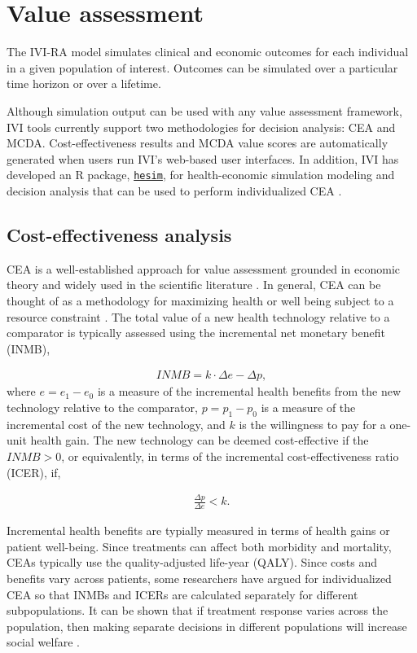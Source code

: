 \documentclass[11pt,final,fleqn]{article}\usepackage[]{graphicx}\usepackage[]{color}
\theoremstyle{plain}
\newcommand{\code}[1]{\texttt{#1}}
\begin{document}
\section{Value assessment}\label{sec:value-assessment}
The IVI-RA model simulates clinical and economic outcomes for each individual in a given population of interest. Outcomes can be simulated over a particular time horizon or over a lifetime. 

Although simulation output can be used with any value assessment framework, IVI tools currently support two methodologies for decision analysis: CEA and MCDA. Cost-effectiveness results and MCDA value scores are automatically generated when users run IVI's web-based user interfaces. In addition, IVI has developed an R package, \code{\href{https://innovationvalueinitiative.github.io/hesim/}{hesim}}, for health-economic simulation modeling and decision analysis that can be used to perform individualized CEA \citep{basu2007value, ioannidis2011individualized, espinoza2014value}. 

\subsection{Cost-effectiveness analysis}\label{sec:cea}
CEA is a well-established approach for value assessment grounded in economic theory and widely used in the scientific literature \citep{briggs2006decision, meltzer2011theoretical, drummond2015methods}. In general, CEA can be thought of as a methodology for maximizing health or well being subject to a resource constraint \citep{garber1997economic}. The total value of a new health technology relative to a comparator is typically assessed using the incremental net monetary benefit (INMB), 

\begin{align}
INMB = k \cdot \Delta e - \Delta p, 
\end{align}
where $e = e_1 - e_0$ is a measure of the incremental health benefits from the new technology relative to the comparator, $p = p_1 - p_0$ is a measure of the incremental cost of the new technology, and $k$ is the willingness to pay for a one-unit health gain. The new technology can be deemed cost-effective if the $INMB > 0$, or equivalently, in terms of the incremental cost-effectiveness ratio (ICER), if,

\begin{align}
\frac{\Delta p}{\Delta e} < k.
\end{align}

Incremental health benefits are typially measured in terms of health gains or patient well-being. Since treatments can affect both morbidity and mortality, CEAs typically use the quality-adjusted life-year (QALY). Since costs and benefits vary across patients, some researchers have argued for individualized CEA \citep{basu2007value, ioannidis2011individualized, espinoza2014value} so that INMBs and ICERs are calculated separately for different subpopulations. It can be shown that if treatment response varies across the population, then making separate decisions in different populations will increase social welfare \citep{basu2007value}.
\end{document}
